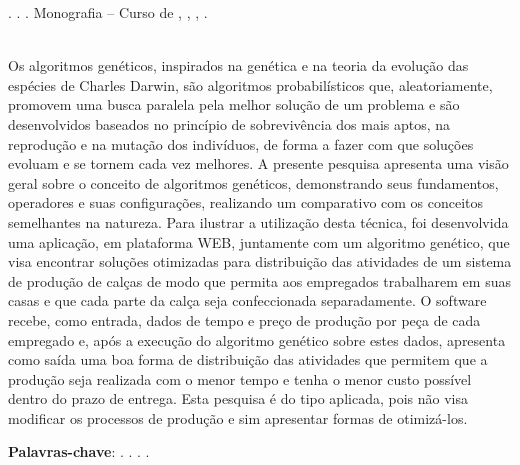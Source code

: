 
\begin{OnehalfSpacing} 

\noindent \imprimirAutorCitacaoMaiuscula. {\bfseries\imprimirtitulo}. {\imprimirdata}.  Monografia -- Curso de {\MakeUppercase\imprimircurso}, {\imprimirinstituicao}, {\imprimirlocal}, {\imprimirdata}.

\vspace{\onelineskip}
\vspace{\onelineskip}
\vspace{\onelineskip}
\vspace{\onelineskip}

\begin{resumo}
~\\
\noindent Os algoritmos genéticos, inspirados na genética e na teoria da evolução das espécies de Charles Darwin,
são algoritmos probabilísticos que, aleatoriamente, promovem uma busca paralela pela melhor solução de um problema e são 
desenvolvidos baseados no princípio de sobrevivência dos mais aptos, na reprodução e na mutação dos indivíduos, de forma a fazer com 
que soluções evoluam e se tornem cada vez melhores. A presente pesquisa apresenta uma visão geral sobre
o conceito de algoritmos genéticos, demonstrando seus fundamentos, operadores e suas configurações, realizando um comparativo 
com os conceitos semelhantes na natureza. Para ilustrar a utilização desta técnica, foi desenvolvida uma aplicação, 
em plataforma WEB, juntamente com um algoritmo genético, que visa encontrar soluções otimizadas para distribuição 
das atividades de um sistema de produção de calças de modo que permita aos empregados trabalharem em suas 
casas e que cada parte da calça seja confeccionada separadamente. O software recebe, como entrada, dados de tempo e preço
de produção por peça de cada empregado e, após a execução do algoritmo genético sobre estes dados, apresenta como saída uma 
boa forma de distribuição das atividades que permitem que a produção seja realizada com o menor tempo e tenha o menor custo possível 
dentro do prazo de entrega. Esta pesquisa é do tipo aplicada, pois não visa modificar os processos de produção e sim apresentar 
formas de otimizá-los.

\vspace{\onelineskip}
\vspace*{\fill}
\noindent \textbf{Palavras-chave}: \imprimirPalavraChaveUm. \imprimirPalavraChaveDois. \imprimirPalavraChaveTres. \imprimirPalavraChaveQuatro.
\vspace{\onelineskip}
\end{resumo}

\end{OnehalfSpacing}
